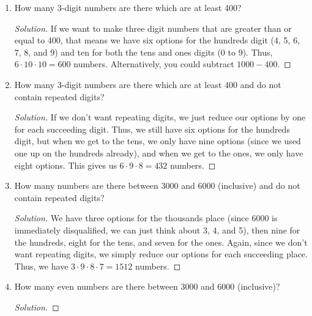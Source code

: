\documentclass{article}
\newenvironment{solution}
  {\renewcommand\qedsymbol{$\blacksquare$}\begin{proof}[Solution]}
  {\end{proof}}
\begin{document}
\begin{enumerate}
\begin{minipage}[t]{.14\textwidth}
    \end{minipage}%
    \item  How many 3-digit numbers are there which are at least 400?\begin{solution} 
        If we want to make three digit numbers that are greater than or equal to 400, that means we have six options for the hundreds digit (4, 5, 6, 7, 8, and 9) and ten for both the 
        tens and ones digits (0 to 9). Thus, $6 \cdot 10 \cdot 10 = 600$ numbers. Alternatively, you could subtract $1000-400$. 
    \end{solution} 
    \item How many 3-digit numbers are there which are at least 400 and do not contain repeated digits?\begin{solution} 
        If we don't want repeating digits, we just reduce our options by one for each succeeding digit. Thus, we still have six options for the hundreds digit, but when 
        we get to the tens, we only have nine options (since we used one up on the hundreds already), and when we get to the ones, we only have eight options. This gives us $6 \cdot 9 \cdot 8 = 432$ numbers.  
    \end{solution} 
    \item  How many numbers are there between 3000 and 6000 (inclusive) and do not contain repeated digits?\begin{solution} 
        We have three options for the thousands place (since 6000 is immediately disqualified, we can just think about 3, 4, and 5), then nine for the hundreds, eight for the tens, and seven for 
        the ones. Again, since we don't want repeating digits, we simply reduce our options for each succeeding place. Thus, we have $3 \cdot 9 \cdot 8 \cdot 7 = 1512$ numbers. 
    \end{solution} 
    \item How many even numbers are there between 3000 and 6000 (inclusive)?\begin{solution} 

\end{solution}
\end{enumerate}
\end{document}
